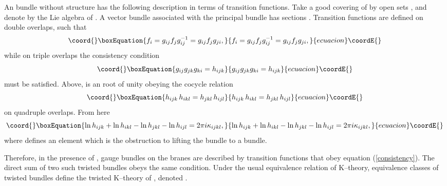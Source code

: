 \documentclass[a4paper,a4paper]{article}
\begin{document}
An \coordHE{} bundle without \coordHE{} structure has the following  
description in terms of transition functions. Take a good covering of \coordHE{}   
by open sets \coordHE{}, and denote by \coordHE{} the Lie algebra of \coordHE{}. 
A vector bundle associated with the principal \coordHE{} bundle has sections 
\coordHE{}. Transition functions \coordHE{} 
are defined on double overlaps, such that   
\begin{equation}\coord{}\boxEquation{  
f_i=g_{ij}f_jg_{ij}^{-1}=g_{ij}f_jg_{ji},  
\label{trans}
}{  
f_i=g_{ij}f_jg_{ij}^{-1}=g_{ij}f_jg_{ji},  
}{ecuacion}\coordE{}\end{equation}  
while on triple overlaps \coordHE{} the consistency condition  
\begin{equation}\coord{}\boxEquation{  
g_{ij}g_{jk}g_{ki}=h_{ijk}  
\label{consistency}
}{  
g_{ij}g_{jk}g_{ki}=h_{ijk}  
}{ecuacion}\coordE{}\end{equation}  
must be satisfied. Above, \coordHE{} is an \coordHE{} root of unity 
obeying the cocycle relation  
\begin{equation}\coord{}\boxEquation{  
h_{ijk}\,h_{ikl}=h_{jkl}\,h_{ijl}  
\label{cocyclei}
}{  
h_{ijk}\,h_{ikl}=h_{jkl}\,h_{ijl}  
}{ecuacion}\coordE{}\end{equation}  
on quadruple overlaps. From here  
\begin{equation}\coord{}\boxEquation{  
\ln h_{ijk} + \ln h_{ikl} - \ln h_{jkl} - \ln h_{ijl}   
=2\pi i \kappa_{ijkl},  
\label{kappa}
}{  
\ln h_{ijk} + \ln h_{ikl} - \ln h_{jkl} - \ln h_{ijl}   
=2\pi i \kappa_{ijkl},  
}{ecuacion}\coordE{}\end{equation}  
where \coordHE{} defines an element \coordHE{} 
which is the obstruction to lifting the \coordHE{} bundle to  
a \coordHE{} bundle.   
  
Therefore, in the presence of \coordHE{}, gauge bundles on the  
branes are described by transition functions that obey  
equation (\ref{consistency}). The direct sum of two such twisted bundles 
obeys the same condition. Under the usual equivalence relation of K--theory, 
equivalence classes of twisted bundles define the twisted K--theory of \coordHE{}, 
denoted \coordHE{} \cite{WITTENDK}.  
\end{document}

